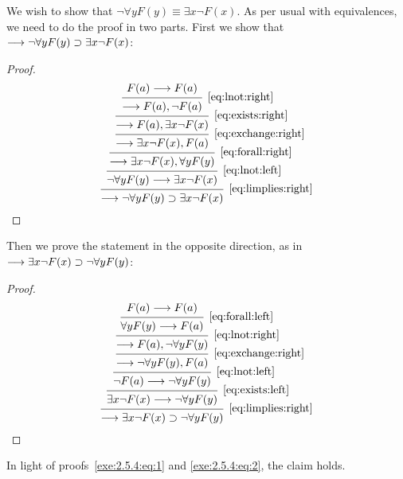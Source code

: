 \documentclass[11pt,a4paper]{article}
\begin{document}
\begin{example}[Exercise 2.5.4]\label{exa:2.5.4}
    We wish to show that \(\lnot\forall y F(y)\equiv\exists x\lnot F(x)\).
    As per usual with equivalences, we need to do the proof in two parts.
    First we show that \(\longrightarrow\lnot\forall y F(y)\supset\exists x\lnot F(x)\):

\begin{proof}
    \begin{equation}\label{exe:2.5.4:eq:1}
        \begin{prooftree}
            \hypo{F(a)\seq F(a)}
            \infer1[\eqref{eq:lnot:right}]{\seq F(a), \lnot F(a)}
            \infer1[\eqref{eq:exists:right}]{\seq F(a), \exists x\lnot F(x)}
            \infer1[\eqref{eq:exchange:right}]{\seq \exists x\lnot F(x), F(a)}
            \infer1[\eqref{eq:forall:right}]{\seq \exists x\lnot F(x), \forall y F(y)}
            \infer1[\eqref{eq:lnot:left}]{\lnot\forall y F(y)\seq \exists x\lnot F(x)}
            \infer1[\eqref{eq:limplies:right}]{\seq\lnot\forall y F(y)\limplies\exists x\lnot F(x)}
        \end{prooftree}
    \end{equation}
\end{proof}

    Then we prove the statement in the opposite direction,
    as in \(\longrightarrow\exists x\lnot F(x)\supset\lnot\forall y F(y)\):

    \begin{proof}
        \begin{equation}\label{exe:2.5.4:eq:2}
            \begin{prooftree}
                \hypo{F(a)\seq F(a)}
                \infer1[\eqref{eq:forall:left}]{\forall y F(y)\seq F(a)}
                \infer1[\eqref{eq:lnot:right}]{\seq F(a), \lnot\forall y F(y)}
                \infer1[\eqref{eq:exchange:right}]{\seq\lnot\forall y F(y), F(a)}
                \infer1[\eqref{eq:lnot:left}]{\lnot F(a)\seq\lnot\forall yF(y)}
                \infer1[\eqref{eq:exists:left}]{\exists x\lnot F(x)\seq\lnot\forall yF(y)}
                \infer1[\eqref{eq:limplies:right}]{\seq\exists x\lnot F(x)\limplies\lnot\forall y F(y)}
            \end{prooftree}
        \end{equation}
    \end{proof}

    In light of proofs~\eqref{exe:2.5.4:eq:1} and \eqref{exe:2.5.4:eq:2}, the claim holds.
\end{example}
\end{document}
